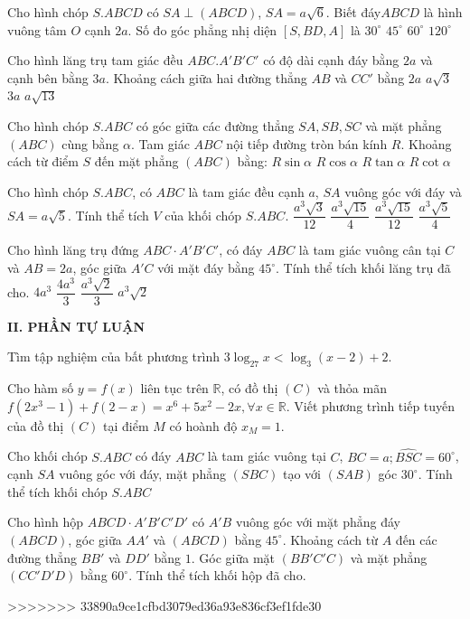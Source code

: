 \begin{ex}
Cho hình chóp $S.ABCD$ có $SA\perp (ABCD)$, $SA=a\sqrt{6}$. Biết đáy$ABCD$ là hình vuông tâm $O$ cạnh $2a$. Số đo góc phẳng nhị diện $\left[S, BD, A\right]$ là
\choice
{${{30}^\circ}$}
{${{45}^\circ}$}
{\True ${{60}^\circ}$}
{${{120}^\circ}$}
\end{ex}
\begin{ex}
Cho hình lăng trụ tam giác đều $ABC.A'B'C'$ có độ dài cạnh đáy bằng $2a$ và cạnh bên bằng $3a$. Khoảng cách giữa hai đường thẳng $AB$ và $CC'$ bằng
\choice
{$2a$}
{\True $a\sqrt{3}$}
{$3a$}
{$a\sqrt{13}$}
\end{ex}
\begin{ex}
Cho hình chóp $S.ABC$ có góc giữa các đường thẳng $SA, SB, SC$ và mặt phẳng $(ABC)$ cùng bằng $\alpha $. Tam giác $ABC$ nội tiếp đường tròn bán kính $R$. Khoảng cách từ điểm $S$ đến mặt phẳng $(ABC)$ bằng:
\choice
{$R\sin \alpha $}
{$R\cos \alpha $}
{\True $R\tan \alpha $}
{$R\cot \alpha $}
\end{ex}
\begin{ex}
Cho hình chóp $S.ABC$, có $ABC$ là tam giác đều cạnh $a$, $SA$ vuông góc với đáy và $SA=a\sqrt{5}$. Tính thể tích $V$ của khối chóp $S.ABC$.
\choice
{$\dfrac{a^3\sqrt{3}}{12}$}
{$\dfrac{a^3\sqrt{15}}{4}$}
{\True $\dfrac{a^3\sqrt{15}}{12}$}
{$\dfrac{a^3\sqrt{5}}{4}$}
\end{ex}
\begin{ex}
Cho hình lăng trụ đứng $ABC \cdot A'B'C'$, có đáy $ABC$ là tam giác vuông cân tại $C$ và $AB=2a$, góc giữa $A'C$ với mặt đáy bằng ${{45}^\circ}$. Tính thể tích khối lăng trụ đã cho.
\choice
{$4a^3$}
{$\dfrac{4a^3}{3}$}
{$\dfrac{a^3\sqrt{2}}{3}$}
{\True $a^3\sqrt{2}$}
\end{ex}

\noindent\textbf{II. PHẦN TỰ LUẬN}

\begin{ex}
Tìm tập nghiệm của bất phương trình $3\log_{27} x <\log_{3}(x-2)+2.$
\end{ex}
\begin{ex}
Cho hàm số $y=f(x)$ liên tục trên $\mathbb{R}$, có đồ thị $(C)$ và thỏa mãn $f\left(2x^3-1\right)+f(2-x)=x^6+5x^2-2x,\forall x\in \mathbb{R}$. Viết phương trình tiếp tuyến của đồ thị $(C)$ tại điểm $M$ có hoành độ $x_M=1$.
\end{ex}
\begin{ex}
Cho khối chóp $S.ABC$ có đáy $ABC$ là tam giác vuông tại $C$, $BC=a;\widehat{BSC}=60^\circ $, cạnh $SA$ vuông góc với đáy, mặt phẳng $(SBC)$ tạo với $(SAB)$ góc $30^\circ $. Tính thể tích khối chóp $S.ABC$
\end{ex}
\begin{ex}
Cho hình hộp $ABCD \cdot A'B'C'D'$ có $A'B$ vuông góc với mặt phẳng đáy $(ABCD)$, góc giữa $AA'$ và $(ABCD)$ bằng $45^\circ $. Khoảng cách từ $A$ đến các đường thẳng $BB'$ và $DD'$ bằng $1$. Góc giữa mặt $\left(BB'C'C\right)$ và mặt phẳng $\left(CC'D'D\right)$ bằng $60^\circ $. Tính thể tích khối hộp đã cho.
\end{ex}
>>>>>>> 33890a9ce1cfbd3079ed36a93e836cf3ef1fde30
